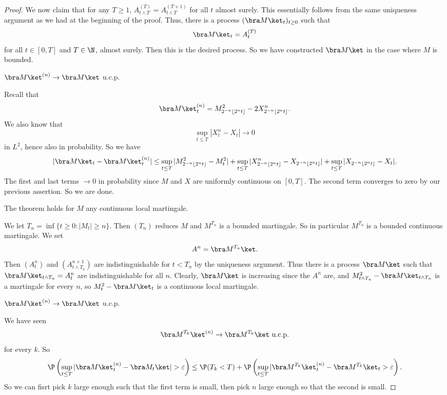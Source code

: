 \documentclass[a4paper]{article}
\begin{document}
\begin{proof}
  We now claim that for any $T \geq 1$, $A_{t \wedge T}^{(T)} = A_{t \wedge T}^{(T + 1)}$ for all $t$ almost surely. This essentially follows from the same uniqueness argument as we had at the beginning of the proof. Thus, there is a process $(\bra M\ket_t)_{t \geq 0}$ such that
  \[
    \bra M\ket_t = A_t^{(T)}
  \]
  for all $t \in [0, T]$ and $T \in \N$, almost surely. Then this is the desired process. So we have constructed $\bra M\ket$ in the case where $M$ is bounded.

  \begin{claim}
    $\bra M\ket^{(n)} \to \bra M\ket$ u.c.p.
  \end{claim}
  Recall that
  \[
    \bra M\ket_t^{(n)} = M^2_{2^{-n}\lfloor 2^n t\rfloor} - 2 X^n_{2^{-n} \lfloor 2^n t\rfloor}.
  \]
  We also know that
  \[
    \sup_{t \leq T} |X_t^n - X_t| \to 0
  \]
  in $L^2$, hence also in probability. So we have
  \[
    |\bra M\ket_t - \bra M\ket^{(n)}_t| \leq \sup_{t \leq T} |M^2_{2^{-n}\lfloor 2^n t\rfloor} - M_t^2| + \sup_{t \leq T} |X^n_{2^{-n}\lfloor 2^n t\rfloor} - X_{2^{-n} \lfloor 2^n t\rfloor}| + \sup_{t \leq T} |X_{2^{-n}\lfloor 2^n t\rfloor} - X_t|.
  \]
  The first and last terms $\to 0$ in probability since $M$ and $X$ are uniformly continuous on $[0, T]$. The second term converges to zero by our previous assertion. So we are done.

  \begin{claim}
    The theorem holds for $M$ any continuous local martingale.
  \end{claim}
  We let $T_n = \inf\{t \geq 0 : |M_t| \geq n\}$. Then $(T_n)$ reduces $M$ and $M^{T_n}$ is a bounded martingale. So in particular $M^{T_n}$ is a bounded continuous martingale. We set
  \[
    A^n = \bra M^{T_n}\ket.
  \]
  Then $(A_t^n)$ and $(A_{t \wedge T_n}^{n + 1})$ are indistinguishable for $t < T_n$ by the uniqueness argument. Thus there is a process $\bra M\ket$ such that $\bra M \ket_{t \wedge T_n} = A_t^n$ are indistinguishable for all $n$. Clearly, $\bra M\ket$ is increasing since the $A^n$ are, and $M^2_{t \wedge T_n} - \bra M\ket_{t \wedge T_n}$ is a martingale for every $n$, so $M^2_t - \bra M\ket_t$ is a continuous local martingale.

  \begin{claim}
    $\bra M\ket^{(n)} \to \bra M\ket$ u.c.p.
  \end{claim}
  We have seen
  \[
    \bra M^{T_k}\ket^{(n)} \to \bra M^{T_k}\ket\text{ u.c.p.}
  \]
  for every $k$. So
  \[
    \P\left(\sup_{t \leq T} |\bra M\ket_t^{(n)} - \bra M_t\ket| > \varepsilon\right) \leq \P(T_k < T) + \P\left(\sup_{t \leq T} |\bra M^{T_k}\ket_t^{(n)} - \bra M^{T_k}\ket_t > \varepsilon\right).
  \]
  So we can fisrt pick $k$ large enough such that the first term is small, then pick $n$ large enough so that the second is small.
\end{proof}
\end{document}
